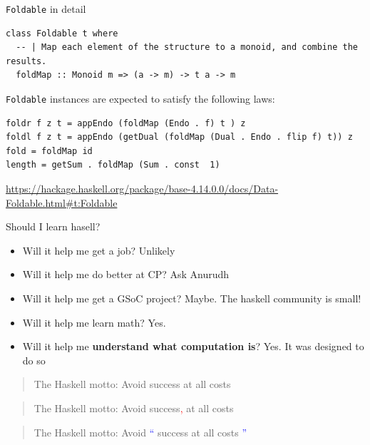 \documentclass[8pt]{beamer}
\begin{document}
\begin{frame}[fragile]{\texttt{Foldable} in detail}


\begin{verbatim}
class Foldable t where
  -- | Map each element of the structure to a monoid, and combine the results.
  foldMap :: Monoid m => (a -> m) -> t a -> m
\end{verbatim}

\verb|Foldable| instances are expected to satisfy the following laws:

\begin{verbatim}
foldr f z t = appEndo (foldMap (Endo . f) t ) z
foldl f z t = appEndo (getDual (foldMap (Dual . Endo . flip f) t)) z
fold = foldMap id
length = getSum . foldMap (Sum . const  1)
\end{verbatim}
{\tiny \url{https://hackage.haskell.org/package/base-4.14.0.0/docs/Data-Foldable.html#t:Foldable}}
\end{frame}

\begin{frame}[fragile]{Should I learn hasell?}

\begin{itemize}
\item Will it help me get a job? \pause Unlikely \pause
\item Will it help me do better at CP? \pause Ask Anurudh \pause
\item Will it help me get a GSoC project? \pause Maybe. The haskell community is small! \pause
\item Will it help me learn math? \pause Yes. \pause
\item Will it help me \textbf{understand what computation is}? \pause Yes. It was designed to do so \pause
\end{itemize}

\pause
\begin{quote}
    The Haskell motto: Avoid success at all costs
\end{quote}
\pause
\begin{quote}
    The Haskell motto: Avoid success\textcolor{red}{,} at all costs
\end{quote}
\pause
\begin{quote}
    The Haskell motto: Avoid \textcolor{blue}{``} success at all costs \textcolor{blue}{''}
\end{quote}
\end{frame}
\end{document}
